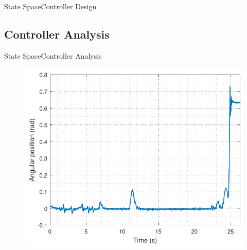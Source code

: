 \begin{frame}{State Space}{Controller Design}
\begin{minipage}{\linewidth}
\begin{minipage}{0.45\linewidth}
\begin{figure}[H]
   			\centering
   		\end{figure}
   	\end{minipage}
  \end{minipage}
\end{frame}

\subsection{Controller Analysis}%

\begin{frame}{State Space}{Controller Analysis}
    \begin{minipage}{\linewidth}
    	\begin{minipage}{0.4\linewidth}
    		\begin{figure}
    			\includegraphics[scale=.35]{Pictures/positionRLTest}
    			\centering
    		\end{figure}
    	\end{minipage}
    	\hspace{0.1\linewidth}
    	\begin{minipage}{0.45\linewidth}
    		\begin{figure}[H]

\end{figure}
\end{minipage}
\end{minipage}
\end{frame}
